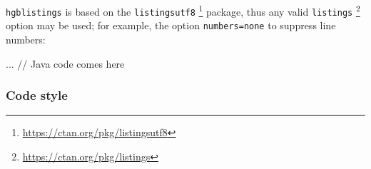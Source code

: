 \documentclass[language=english]{hgbarticle}
\begin{document}
%
\texttt{hgblistings} is based on the \texttt{listingsutf8}%
\footnote{\url{https://ctan.org/pkg/listingsutf8}}
package, thus any valid \texttt{listings}%
\footnote{\url{https://ctan.org/pkg/listings}}
option may be used; for example, the option \texttt{numbers=none} to suppress
line numbers:
%
\begin{LaTeXCode}[numbers=none]
    \begin{JavaCode}[numbers=none]
    ... // Java code comes here
    \end{JavaCode}
\end{LaTeXCode}


\subsubsection{Code style}
\label{sec:CodeStyle}
\end{document}

